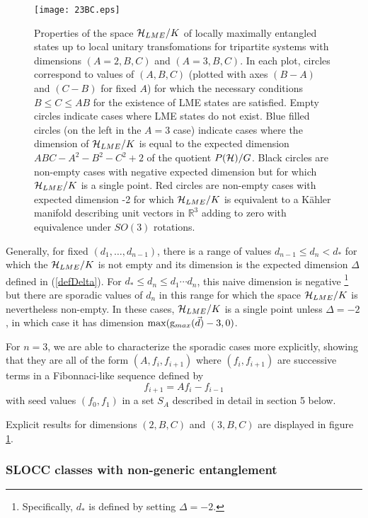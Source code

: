 \documentclass[12pt]{article}
\theoremstyle{definition}
\newcommand{\be}{\begin{equation}}
\newcommand{\ee}{\end{equation}}
\begin{document}
\begin{figure}
\centering
\texttt{[image: 23BC.eps]}
\caption{Properties of the space ${\cal H}_{LME}/K$ of locally maximally entangled states up to local unitary transfomations for tripartite systems with dimensions $(A=2,B,C)$ and $(A=3,B,C)$. In each plot, circles correspond to values of $(A,B,C)$ (plotted with axes $(B-A)$ and $(C-B)$ for fixed $A$) for which the necessary conditions $B \le C \le AB$ for the existence of LME states are satisfied. Empty circles indicate cases where LME states do not exist. Blue filled circles (on the left in the $A=3$ case) indicate cases where the dimension of ${\cal H}_{LME}/K$ is equal to the expected dimension $ABC - A^2 - B^2 - C^2 + 2$ of the quotient $P({\cal H})/G$. Black circles are non-empty cases with negative expected dimension but for which ${\cal H}_{LME}/K$ is a single point. Red circles are non-empty cases with expected dimension -2 for which ${\cal H}_{LME}/K$ is equivalent to a K\"ahler manifold describing unit vectors in $\mathbb{R}^3$ adding to zero with equivalence under $SO(3)$ rotations.}
\label{fig:23BC}
\end{figure}

Generally, for fixed
$(d_1,\dots, d_{n-1})$, there is a range of values $d_{n-1} \le d_n <
d_*$ for which the ${\cal H}_{LME}/K$ is not empty and its dimension
is the expected dimension $\Delta$ defined in (\ref{defDelta}). For $d_* \le d_n \le d_1 \cdots d_n$,
this naive dimension is negative \footnote{Specifically, $d_*$ is
defined by setting $\Delta = -2$.} but there are sporadic values of
$d_n$ in this range for which the space ${\cal H}_{LME}/K$ is
nevertheless non-empty. In these cases, ${\cal H}_{LME}/K$ is a single point unless $\Delta =
-2$, in which case it has dimension $\max ({\rm g}_{max}(\vec{d}) -3,0)$.

For $n=3$, we are able to characterize the sporadic cases more explicitly, showing that they are all of the form $(A, f_i, f_{i+1})$ where $(f_i,f_{i+1})$ are successive terms in a Fibonnaci-like sequence defined by
\be
\label{Fib}
f_{i+1} = A f_i - f_{i-1}
\ee
with seed values $(f_0,f_1)$ in a set $S_A$ described in detail in section 5 below. 

Explicit results for dimensions $(2,B,C)$ and $(3,B,C)$ are displayed in figure \ref{fig:23BC}.


\subsubsection{SLOCC classes with non-generic entanglement}
\end{document}
